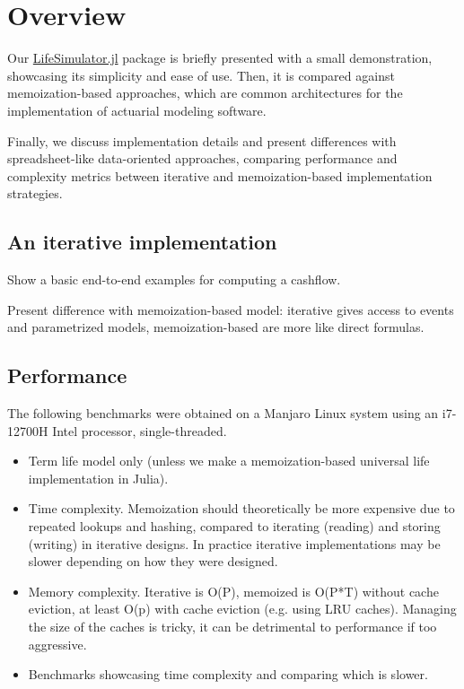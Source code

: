 \documentclass{article}
\begin{document}
\section*{Overview}

Our \hyperlink{https://github.com/JuliaActuary/LifeSimulator.jl}{LifeSimulator.jl} package is briefly presented with a small demonstration, showcasing its simplicity and ease of use. Then, it is compared against memoization-based approaches, which are common architectures for the implementation of actuarial modeling software.

Finally, we discuss implementation details and present differences with spreadsheet-like data-oriented approaches, comparing performance and complexity metrics between iterative and memoization-based implementation strategies.

\subsection*{An iterative implementation}

Show a basic end-to-end examples for computing a cashflow.

Present difference with memoization-based model: iterative gives access to events and parametrized models, memoization-based are more like direct formulas.

\subsection*{Performance}

The following benchmarks were obtained on a Manjaro Linux system using an i7-12700H Intel processor, single-threaded.

\begin{itemize}
    \item Term life model only (unless we make a memoization-based universal life implementation in Julia).
    \item Time complexity. Memoization should theoretically be more expensive due to repeated lookups and hashing, compared to iterating (reading) and storing (writing) in iterative designs. In practice iterative implementations may be slower depending on how they were designed.
    \item Memory complexity. Iterative is O(P), memoized is O(P*T) without cache eviction, at least O(p) with cache eviction (e.g. using LRU caches). Managing the size of the caches is tricky, it can be detrimental to performance if too aggressive.
    \item Benchmarks showcasing time complexity and comparing which is slower.
\end{itemize}



\end{document}
